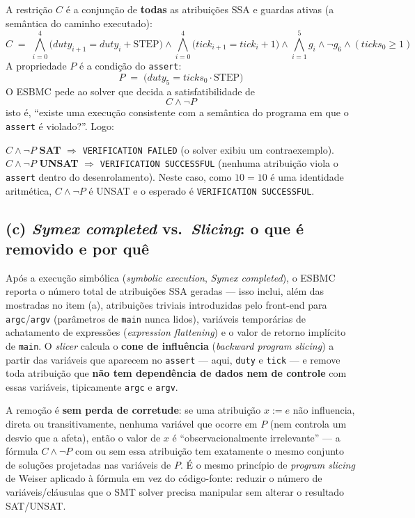 \documentclass[12pt,a4paper]{article}
\newcommand{\vv}[1]{\texttt{#1}}
\begin{document}
A restri\c{c}\~ao $C$ \'e a conjun\c{c}\~ao de \textbf{todas} as atribui\c{c}\~oes SSA e
guardas ativas (a sem\^antica do caminho executado):
\[
  C \;=\; \bigwedge_{i=0}^{4}\bigl(duty_{i+1}=duty_i+\mathrm{STEP}\bigr) \wedge
          \bigwedge_{i=0}^{4}\bigl(tick_{i+1}=tick_i+1\bigr) \wedge
          \bigwedge_{i=1}^{5} g_i \wedge \neg g_6 \wedge (ticks_0\ge1)
\]
A propriedade $P$ \'e a condi\c{c}\~ao do \texttt{assert}:
\[
  P \;=\; \bigl(duty_5 = ticks_0\cdot\mathrm{STEP}\bigr)
\]
O ESBMC pede ao solver que decida a satisfatibilidade de
\[
  C \wedge \neg P
\]
isto \'e, ``existe uma execu\c{c}\~ao consistente com a sem\^antica do programa em que o
\texttt{assert} \'e violado?''. Logo:
\begin{tcolorbox}[resultbox]
$C\wedge\neg P$ \textbf{SAT} $\Rightarrow$ \texttt{VERIFICATION FAILED} (o solver exibiu
um contraexemplo). $C\wedge\neg P$ \textbf{UNSAT} $\Rightarrow$ \texttt{VERIFICATION
SUCCESSFUL} (nenhuma atribui\c{c}\~ao viola o \texttt{assert} dentro do desenrolamento).
Neste caso, como $10=10$ \'e uma identidade aritm\'etica, $C\wedge\neg P$ \'e UNSAT e o
esperado \'e \texttt{VERIFICATION SUCCESSFUL}.
\end{tcolorbox}

\subsection{(c) \emph{Symex completed} vs.\ \emph{Slicing}: o que \'e removido e por qu\^e}

Ap\'os a execu\c{c}\~ao simb\'olica (\emph{symbolic execution}, \emph{Symex completed}),
o ESBMC reporta o n\'umero total de atribui\c{c}\~oes SSA geradas --- isso inclui, al\'em
das mostradas no item (a), atribui\c{c}\~oes triviais introduzidas pelo front-end para
\vv{argc}/\vv{argv} (par\^ametros de \vv{main} nunca lidos), vari\'aveis tempor\'arias de
achatamento de express\~oes (\emph{expression flattening}) e o valor de retorno impl\'icito
de \vv{main}. O \emph{slicer} calcula o \textbf{cone de influ\^encia} (\emph{backward
program slicing}) a partir das vari\'aveis que aparecem no \texttt{assert} --- aqui,
\vv{duty} e \vv{tick} --- e remove toda atribui\c{c}\~ao que \textbf{n\~ao tem
depend\^encia de dados nem de controle} com essas vari\'aveis, tipicamente \vv{argc} e
\vv{argv}.

\begin{tcolorbox}[notabox]
A remo\c{c}\~ao \'e \textbf{sem perda de corretude}: se uma atribui\c{c}\~ao $x:=e$ n\~ao
influencia, direta ou transitivamente, nenhuma vari\'avel que ocorre em $P$ (nem controla
um desvio que a afeta), ent\~ao o valor de $x$ \'e ``observacionalmente irrelevante'' --- a
f\'ormula $C\wedge\neg P$ com ou sem essa atribui\c{c}\~ao tem exatamente o mesmo conjunto
de solu\c{c}\~oes projetadas nas vari\'aveis de $P$. \'E o mesmo princ\'ipio de
\emph{program slicing} de Weiser aplicado \`a f\'ormula em vez do c\'odigo-fonte: reduzir o
n\'umero de vari\'aveis/cl\'ausulas que o SMT solver precisa manipular sem alterar o
resultado SAT/UNSAT.
\end{tcolorbox}
\end{document}
